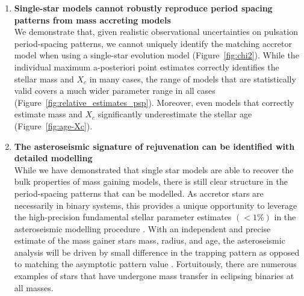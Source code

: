 \documentclass[desactivate]{aa}
\begin{document}
\begin{enumerate}
    \vspace{1cm}
    \item {\bf Single-star models cannot robustly reproduce period spacing patterns from mass accreting models}\\We demonstrate that, given realistic observational uncertainties on pulsation period-spacing patterns, we cannot uniquely identify the matching accretor model when using a single-star evolution model (Figure~\ref{fig:chi2}). While the individual maximum a-posteriori point estimates correctly identifies the stellar mass and $X_c$ in many cases, the range of models that are statistically valid covers a much wider parameter range in all cases (Figure~\ref{fig:relative_estimates_psp}). Moreover, even models that correctly estimate mass and $X_c$ significantly underestimate the stellar age (Figure~\ref{fig:age-Xc}).

    \item {\bf The asteroseismic signature of rejuvenation can be identified with detailed modelling} \\
    While we have demonstrated that single star models are able to recover the bulk properties of mass gaining models, there is still clear structure in the period-spacing patterns that can be modelled. As accretor stars are necessarily in binary systems, this provides a unique opportunity to leverage the high-precision fundamental stellar parameter estimates $(<1\%)$ in the asteroseismic modelling procedure \citep[e.g.][]{Torres2010,Johnston2019a,Sekaran2021}. With an independent and precise estimate of the mass gainer stars mass, radius, and age, the asteroseismic analysis will be driven by small difference in the trapping pattern as opposed to matching the asymptotic pattern value \citep{Johnston2019b}. Fortuitously, there are numerous examples of stars that have undergone mass transfer in eclipsing binaries at all masses. 
\end{enumerate}
\end{document}
